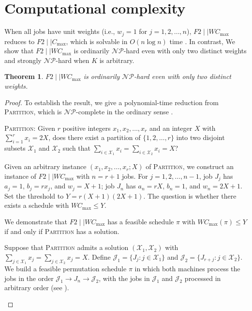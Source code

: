 \documentclass[12pt]{article}
\newtheorem{theorem}{Theorem}[section]
\let\origsection\section
\renewcommand{\section}{\FloatBarrier\origsection}
\begin{document}
\begin{sloppypar}
        \section{Computational complexity}  \label{sec:complexity}
        
        When all jobs have unit weights (i.e., $w_j=1$ for $j=1, 2, \ldots, n$), $F2 \mid \mid W C_{\max}$ reduces to $F2 \mid \mid C_{\max}$, which is solvable in $O(n \log n)$ time \citep{Johnson1954NRL}. In contrast, We show that $F2 \mid \mid W C_{\max}$ is ordinarily $\mathcal{NP}$-hard even with only two distinct weights and strongly $\mathcal{NP}$-hard when $K$ is arbitrary.
        
        \begin{theorem}\label{thm:nphard}
            $F2 \mid \mid W C_{\max}$ is ordinarily $\mathcal{NP}$-hard even with only two distinct weights.
        \end{theorem}
        \begin{proof}
            To establish the result, we give a polynomial-time reduction from \textsc{Partition}, which is $\mathcal{NP}$-complete in the ordinary sense \citep{GareyJohnson1979computer}.
            
            \textsc{Partition}: Given $r$ positive integers $x_1, x_2, \ldots, x_r$ and an integer $X$ with
            $\sum_{i=1}^{r}x_i=2X$, does there exist a partition of $\{1, 2, \ldots, r\}$ into two disjoint subsets $\mathcal{X}_1$ and $\mathcal{X}_2$ such that $\sum_{i \in \mathcal{X}_1} x_i=\sum_{i\in \mathcal{X}_2} x_i=X$?
            
            Given an arbitrary instance $(x_1, x_2, \ldots, x_r; X)$ of \textsc{Partition}, we construct an instance of $F2 \mid \mid W C_{\max}$ with $n=r+1$ jobs. For $j=1, 2, \ldots, n-1$, job $J_j$ has $a_j=1$, $b_j=r x_j$, and $w_j=X+1$; job $J_n$ has $a_n=rX$, $b_n=1$, and $w_n=2X+1$. Set the threshold to $Y=r(X+1)(2X+1)$. The question is whether there exists a schedule with $W C_{\max} \leq Y$.
            
            We demonstrate that $F2 \mid \mid W C_{\max}$ has a feasible schedule $\pi$ with $W C_{\max}(\pi) \leq Y$ if and only if \textsc{Partition} has a solution.
            
            Suppose that \textsc{Partition} admits a solution $(\mathcal{X}_1, \mathcal{X}_2)$ with $\sum_{j \in \mathcal{X}_1} x_j = \sum_{j \in \mathcal{X}_2} x_j=X$. Define $\mathcal{J}_1=\{J_j: j \in \mathcal{X}_1\}$ and $\mathcal{J}_2=\{J_{r+j}: j \in \mathcal{X}_2\}$. We build a feasible permutation schedule $\pi$ in which both machines process the jobs in the order $\mathcal{J}_1 \to J_n \to \mathcal{J}_2$, with the jobs in $\mathcal{J}_1$ and $\mathcal{J}_2$ processed in arbitrary order (see ). 
            \begin{figure}[H]
                \centering
                \begin{tikzpicture}[x=0.15in, y=0.3in]
                    

\end{tikzpicture}
\end{figure}
\end{proof}
\end{sloppypar}
\end{document}
